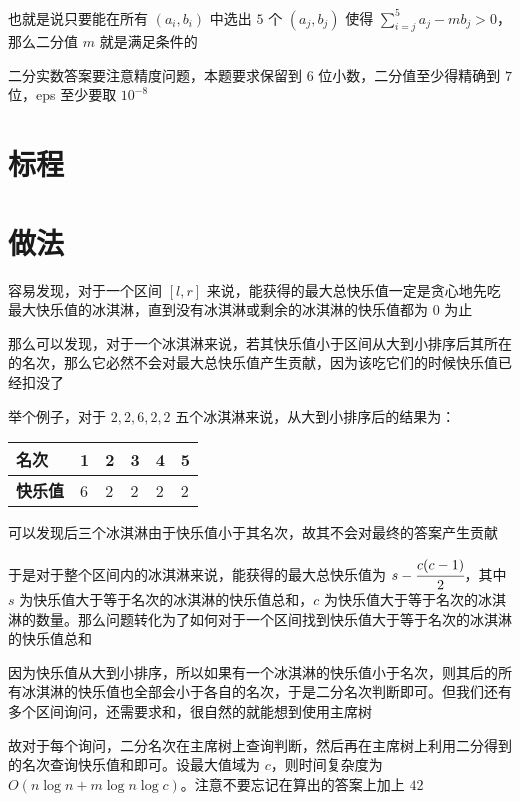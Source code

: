 \documentclass{../cpct/ctsol}
\begin{document}
也就是说只要能在所有 $(a_i,b_i)$ 中选出 $5$ 个 $(a_j,b_j)$ 使得 $\sum_{i=j}^{5}a_j-mb_j > 0$，那么二分值 $m$ 就是满足条件的

二分实数答案要注意精度问题，本题要求保留到 $6$ 位小数，二分值至少得精确到 $7$ 位，eps 至少要取 ${10}^{-8}$

\section*{标程}


\makesolution
\section*{做法}

容易发现，对于一个区间 $[l,r]$ 来说，能获得的最大总快乐值一定是贪心地先吃最大快乐值的冰淇淋，直到没有冰淇淋或剩余的冰淇淋的快乐值都为 $0$ 为止

那么可以发现，对于一个冰淇淋来说，若其快乐值小于区间从大到小排序后其所在的名次，那么它必然不会对最大总快乐值产生贡献，因为该吃它们的时候快乐值已经扣没了

举个例子，对于 $2,2,6,2,2$ 五个冰淇淋来说，从大到小排序后的结果为：

\begin{center}
    \begin{tabularx}{\textwidth}{MMMMMM}
        \toprule
        \textbf{名次}  & 1 & 2 & 3 & 4 & 5 \\
        \midrule
        \textbf{快乐值} & 6 & 2 & 2 & 2 & 2 \\
        \bottomrule
    \end{tabularx}
\end{center}

可以发现后三个冰淇淋由于快乐值小于其名次，故其不会对最终的答案产生贡献

于是对于整个区间内的冰淇淋来说，能获得的最大总快乐值为 $s-\cfrac{c(c-1)}{2}$，其中 $s$ 为快乐值大于等于名次的冰淇淋的快乐值总和，$c$ 为快乐值大于等于名次的冰淇淋的数量。那么问题转化为了如何对于一个区间找到快乐值大于等于名次的冰淇淋的快乐值总和

因为快乐值从大到小排序，所以如果有一个冰淇淋的快乐值小于名次，则其后的所有冰淇淋的快乐值也全部会小于各自的名次，于是二分名次判断即可。但我们还有多个区间询问，还需要求和，很自然的就能想到使用主席树

故对于每个询问，二分名次在主席树上查询判断，然后再在主席树上利用二分得到的名次查询快乐值和即可。设最大值域为 $c$，则时间复杂度为 $O(n \log n + m \log n \log c)$。注意不要忘记在算出的答案上加上 $42$
\end{document}

